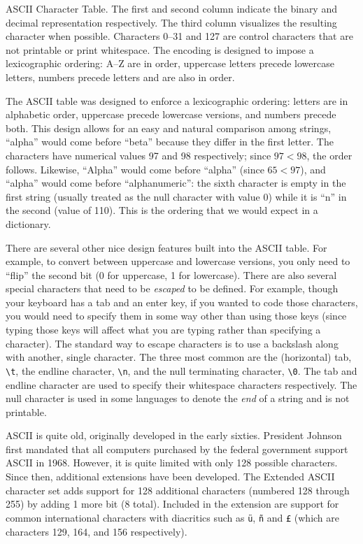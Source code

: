 \begin{table}
\centering

\caption[ASCII Character Table]{ASCII Character Table.  The first and second
column indicate the binary and decimal representation respectively.  The third column
visualizes the resulting character when possible.  Characters 0--31 and 127 are
control characters that are not printable or print whitespace.  The encoding is
designed to impose a lexicographic ordering: A--Z are in order, uppercase letters
precede lowercase letters, numbers precede letters and are also in order.}
\label{table:asciiTable}
\end{table}

The ASCII table was designed to enforce a lexicographic ordering: letters are in alphabetic
order, uppercase precede lowercase versions, and numbers precede both.  This
design allows for an easy and natural comparison among strings, ``alpha''
would come before ``beta'' because they differ in the first letter.  The characters
have numerical values 97 and 98 respectively; since $97 < 98$, the order follows.
Likewise, ``Alpha'' would come before ``alpha'' (since $65 < 97$), and ``alpha''
would come before ``alphanumeric'': the sixth character is empty in the first string
(usually treated as the null character with value 0) while it is ``n'' in the second (value of 110).
This is the ordering that we would expect in a dictionary.

There are several other nice design features built into the ASCII table.  For example, 
to convert between uppercase and lowercase versions, you only need to ``flip'' the second bit
(0 for uppercase, 1 for lowercase).  There are also several special characters that need to be
\emph{escaped} to be defined.  For example, though your keyboard has a tab and an
enter key, if you wanted to code those characters, you would need to specify them
in some way other than using those keys (since typing those keys will affect what you are
typing rather than specifying a character).  The standard way to escape characters
is to use a backslash along with another, single character.  The three most common
are the (horizontal) tab, \verb|\t|, the endline character, \verb|\n|, and the null
terminating character, \verb|\0|.  The tab and endline character are used to 
specify their whitespace characters respectively.  The null character is used
in some languages to denote the \emph{end} of a string and is not printable.

ASCII is quite old, originally developed in the early sixties.  President Johnson first
mandated that all computers purchased by the federal government support ASCII in 1968.
However, it is quite limited with only 128 possible characters.  Since then, additional 
extensions have been developed.  The Extended ASCII character set adds support
for 128 additional characters (numbered 128 through 255) by adding 1 more bit (8
total).  Included in the extension are support for common international characters with
diacritics such as \texttt{\"{u}}, \texttt{\~{n}} and \texttt{\pounds} (which are characters
129, 164, and 156 respectively).

